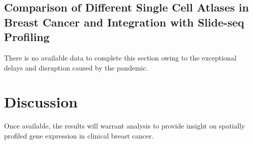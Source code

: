 \subsection{Comparison of Different Single Cell Atlases in Breast Cancer and Integration with Slide-seq Profiling}
There is no available data to complete this section owing to the exceptional delays and disruption caused by the pandemic. 

\section{Discussion}
Once available, the results will warrant analysis to provide insight on spatially profiled gene expression in clinical breast cancer.





